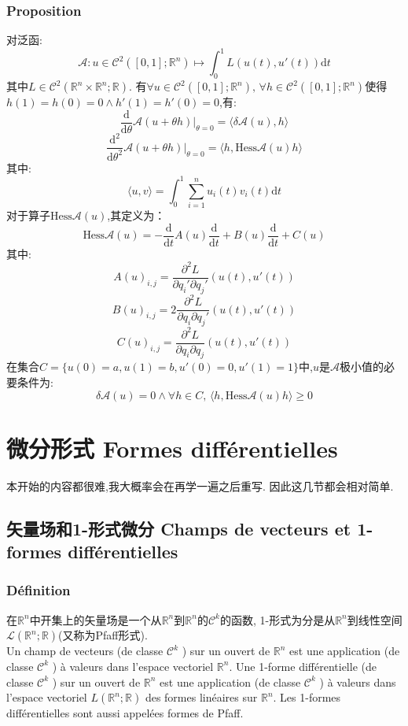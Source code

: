 \documentclass[12pt, a4paper, oneside]{ctexbook}
\newcommand{\di }{\text{d}}%
\newcommand{\pian }{\partial}%
\newcommand{\R }{\mathbb{R}}%
\newcommand{\C }{\mathcal{C}}%
\newcommand{\Hess }{\text{Hess}}%
\begin{document}
  \subsubsection{Proposition}
  对泛函:
  $$
  \mathcal{A}:u\in\C^2([0,1];\R^n)\mapsto \int_0^1 L(u(t),u'(t)) \di t
  $$
  其中$L\in \C^2(\R^n\times\R^n;\R)$.
  有$\forall u\in\C^2([0,1];\R^n),\,\forall h\in  \C^2([0,1];\R^n)$使得
  $h(1)=h(0)=0\land h'(1)=h'(0)=0$,有:
  $$
  \frac{\di}{\di\theta}\mathcal{A}(u+\theta h)|_{\theta=0}=\langle \delta\mathcal{A}(u),h \rangle 
  $$
  $$
  \frac{\di^2}{\di\theta^2}\mathcal{A}(u+\theta h)|_{\theta=0}=\langle h,\Hess\mathcal{A}(u)h \rangle 
  $$
  其中:
  $$
  \langle u,v \rangle =\int_0^1 \sum_{i=1}^{n}u_i(t)v_i(t) \di t
  $$
  对于算子$\Hess\mathcal{A}(u)$,其定义为：
  $$
  \Hess\mathcal{A}(u)=-\frac{\di}{\di t}A(u)\frac{\di}{\di t}+B(u)\frac{\di}{\di t}+C(u)
  $$
  其中:
  $$
  A(u)_{i,j}= \frac{\pian^2 L}{\pian q_i'\pian q_j'}(u(t),u'(t))
  $$
  $$
  B(u)_{i,j}=2\frac{\pian^2 L}{\pian q_i\pian q_j'}(u(t),u'(t))
  $$
  $$
  C(u)_{i,j}=\frac{\pian^2 L}{\pian q_i\pian q_j}(u(t),u'(t))
  $$
  在集合$C=\{u(0)=a,u(1)=b,u'(0)=0,u'(1)=1\}$中,$u$是$\mathcal{A}$极小值的必要条件为:
  $$
  \delta\mathcal{A}(u)=0\land \forall h\in C,\,\langle h,\Hess\mathcal{A}(u)h \rangle \geq 0
  $$

  \section{微分形式 Formes différentielles}
  本开始的内容都很难,我大概率会在再学一遍之后重写.
  因此这几节都会相对简单.
  \subsection{矢量场和1-形式微分 Champs de vecteurs et 1-formes différentielles}
  \subsubsection{Définition}
  在$\R^n$中开集上的矢量场是一个从$\R^n$到$\R^n$的$\C^k$的函数,
  1-形式为分是从$\R^n$到线性空间$\mathcal{L}(\R^n;\R)$(又称为Pfaff形式).\\
  \indent
  Un champ de vecteurs (de classe $\C^k$ ) sur un ouvert de $\R^n$ est une application (de classe $\C^k$ ) à valeurs dans l'espace vectoriel $\R^n$. 
  Une 1-forme différentielle (de classe $\C^k$ ) sur un ouvert de $\R^n$ est une application (de classe $\C^k$ ) à valeurs dans l'espace vectoriel $L(\R^n; \R)$ des formes linéaires sur $\R^n$. 
  Les 1-formes différentielles sont aussi appelées formes de Pfaff.
\end{document}
